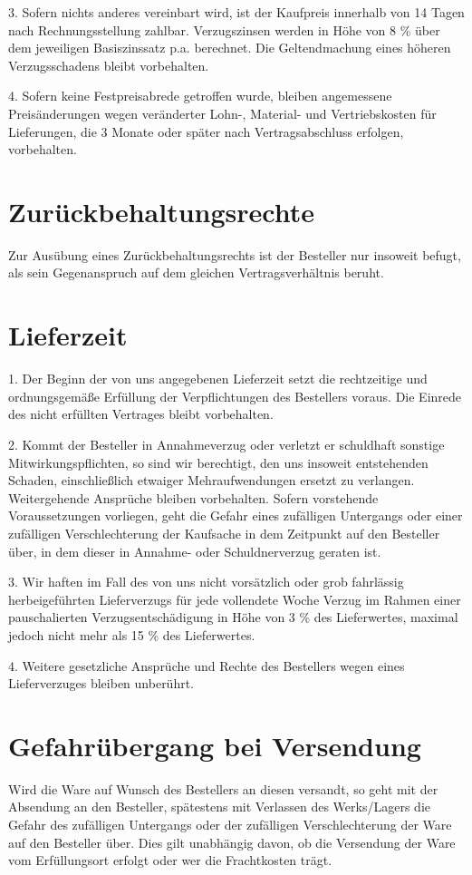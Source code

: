 \documentclass[a4paper, final, 11pt, oneside]{scrartcl}
\begin{document}
\begin{multicols}{2}
3. Sofern nichts anderes vereinbart wird, ist der Kaufpreis innerhalb von 14 Tagen nach Rechnungsstellung zahlbar. Verzugszinsen werden in Höhe von 8 \% über dem jeweiligen Basiszinssatz p.a. berechnet. Die Geltendmachung eines höheren Verzugsschadens bleibt vorbehalten.

4. Sofern keine Festpreisabrede getroffen wurde, bleiben angemessene Preisänderungen wegen veränderter Lohn-, Material- und Vertriebskosten für Lieferungen, die 3 Monate oder später nach Vertragsabschluss erfolgen, vorbehalten.

\section{Zurückbehaltungsrechte}
Zur Ausübung eines Zurückbehaltungsrechts ist der Besteller nur insoweit befugt, als sein Gegenanspruch auf dem gleichen Vertragsverhältnis beruht.

\section{Lieferzeit}
1. Der Beginn der von uns angegebenen Lieferzeit setzt die rechtzeitige und ordnungsgemäße Erfüllung der Verpflichtungen des Bestellers voraus. Die Einrede des nicht erfüllten Vertrages bleibt vorbehalten.

2. Kommt der Besteller in Annahmeverzug oder verletzt er schuldhaft sonstige Mitwirkungspflichten, so sind wir berechtigt, den uns insoweit entstehenden Schaden, einschließlich etwaiger Mehraufwendungen ersetzt zu verlangen. Weitergehende Ansprüche bleiben vorbehalten. Sofern vorstehende Voraussetzungen vorliegen, geht die Gefahr eines zufälligen Untergangs oder einer zufälligen Verschlechterung der Kaufsache in dem Zeitpunkt auf den Besteller über, in dem dieser in Annahme- oder Schuldnerverzug geraten ist.

3. Wir haften im Fall des von uns nicht vorsätzlich oder grob fahrlässig herbeigeführten Lieferverzugs für jede vollendete Woche Verzug im Rahmen einer pauschalierten Verzugsentschädigung in Höhe von 3 \% des Lieferwertes, maximal jedoch nicht mehr als 15 \% des Lieferwertes.

4. Weitere gesetzliche Ansprüche und Rechte des Bestellers wegen eines Lieferverzuges bleiben unberührt.

\section{Gefahrübergang bei Versendung}
Wird die Ware auf Wunsch des Bestellers an diesen versandt, so geht mit der Absendung an den Besteller, spätestens mit Verlassen des Werks/Lagers die Gefahr des zufälligen Untergangs oder der zufälligen Verschlechterung der Ware auf den Besteller über. Dies gilt unabhängig davon, ob die Versendung der Ware vom Erfüllungsort erfolgt oder wer die Frachtkosten trägt.


\end{multicols}
\end{document}

